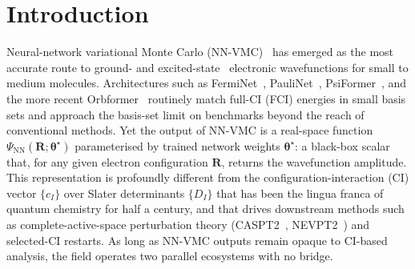 \documentclass[journal=jctcce,manuscript=article,layout=traditional]{achemso}
\begin{document}
\begin{abstract}
matrices, natural transition orbitals, oscillator strengths, and
state-specific NEVPT2 corrections for the $\tilde{A}\,^1B_1$ Rydberg
band of ; the convergence of the match-overlap between the
recovered $\widehat c^{(k)}$ and the closest CAS eigenvector as the CAS
``vocabulary'' grows is the natural figure of merit for the NN-VMC
$\to$ chemist's-language translation. At deployment, the framework requires only a single Hartree--Fock SCF
cycle to seed the Pass-1 orbital frame; no CASSCF, CASCI, or FCI step
appears anywhere. We validate this on a fully-converged
/cc-pVDZ FermiNet+Jastrow trial sitting $65.7$\,m$E_{\rm h}$
\emph{below} FCI(cc-pVDZ): the HF-seeded NN-NO bootstrap recovers the
reference-determinant amplitude to $0.95$ vs FCI's $0.98$ and the
dominant orbital alignment to $0.9998$, confirming the framework
remains diagnostic in the beyond-basis-correlation regime.
The framework lowers the cost of
running NN-VMC for downstream chemistry from ``replicate every
post-HF method from scratch'' to ``plug the recovered $\widehat c$ into
the existing pipeline,'' and is released open-source under the
\texttt{compressed-sensing} branch of \textsc{OmegaQMC}.
\end{abstract}

\section{Introduction}

Neural-network variational Monte Carlo
(NN-VMC)~\cite{Pfau2020FermiNet,Hermann2020PauliNet,vonGlehn2023PsiFormer}
has emerged as the most accurate route to ground- and
excited-state~\cite{Pfau2024ExcitedStates} electronic wavefunctions for
small to medium molecules. Architectures such as
FermiNet~\cite{Pfau2020FermiNet}, PauliNet~\cite{Hermann2020PauliNet},
PsiFormer~\cite{vonGlehn2023PsiFormer}, and the more recent
Orbformer~\cite{Foster2025Orbformer} routinely match full-CI (FCI)
energies in small basis sets and approach the basis-set limit on
benchmarks beyond the reach of conventional methods. Yet the output of
NN-VMC is a real-space function
$\Psi_{\mathrm{NN}}(\mathbf{R}; \bm{\theta}^{\star})$
parameterised by trained network weights $\bm{\theta}^{\star}$: a
black-box scalar that, for any given electron configuration
$\mathbf{R}$, returns the wavefunction amplitude. This representation
is profoundly different from the configuration-interaction (CI) vector
$\{c_I\}$ over Slater determinants $\{D_I\}$ that has been the lingua
franca of quantum chemistry for half a century, and that drives
downstream methods such as complete-active-space perturbation
theory (CASPT2~\cite{Andersson1992CASPT2},
NEVPT2~\cite{Angeli2001NEVPT2}) and selected-CI restarts. As long as NN-VMC outputs
remain opaque to CI-based analysis, the field operates two parallel
ecosystems with no bridge.
\end{document}
